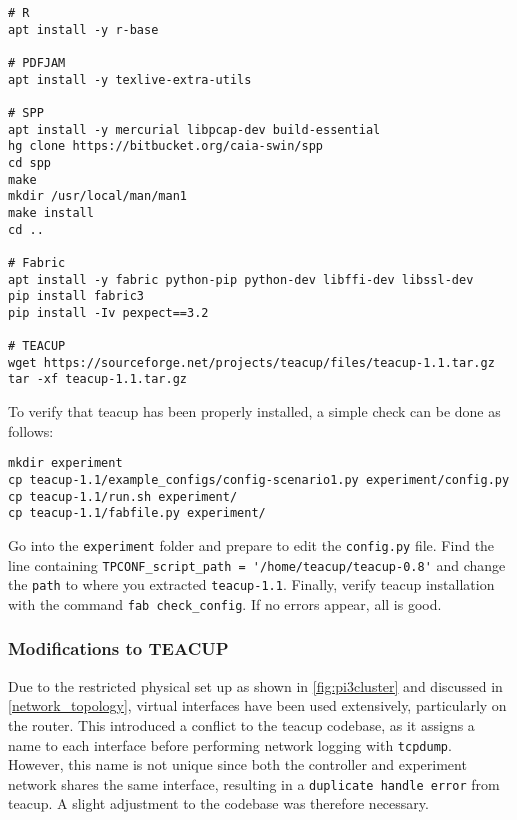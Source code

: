 
\begin{verbatim}
# R
apt install -y r-base

# PDFJAM
apt install -y texlive-extra-utils

# SPP
apt install -y mercurial libpcap-dev build-essential
hg clone https://bitbucket.org/caia-swin/spp
cd spp
make
mkdir /usr/local/man/man1
make install
cd ..

# Fabric
apt install -y fabric python-pip python-dev libffi-dev libssl-dev
pip install fabric3
pip install -Iv pexpect==3.2

# TEACUP
wget https://sourceforge.net/projects/teacup/files/teacup-1.1.tar.gz
tar -xf teacup-1.1.tar.gz
\end{verbatim}

To verify that \gls{teacup} has been properly installed, a simple check can be done as follows:

\begin{verbatim}
mkdir experiment
cp teacup-1.1/example_configs/config-scenario1.py experiment/config.py
cp teacup-1.1/run.sh experiment/
cp teacup-1.1/fabfile.py experiment/
\end{verbatim}

Go into the \lstinline{experiment} folder and prepare to edit the \lstinline{config.py} file. Find the line containing \lstinline{TPCONF_script_path = '/home/teacup/teacup-0.8'} and change the \lstinline{path} to where you extracted \lstinline{teacup-1.1}. Finally, verify \gls{teacup} installation with the command \lstinline{fab check_config}. If no errors appear, all is good.


\subsubsection{Modifications to TEACUP}

Due to the restricted physical set up as shown in \ref{fig:pi3cluster} and discussed in \ref{network_topology}, virtual interfaces have been used extensively, particularly on the router. This introduced a conflict to the \gls{teacup} codebase, as it assigns a name to each interface before performing network logging with \lstinline{tcpdump}. However, this name is not unique since both the controller and experiment network shares the same interface, resulting in a \lstinline{duplicate handle error} from \gls{teacup}. A slight adjustment to the codebase was therefore necessary.

